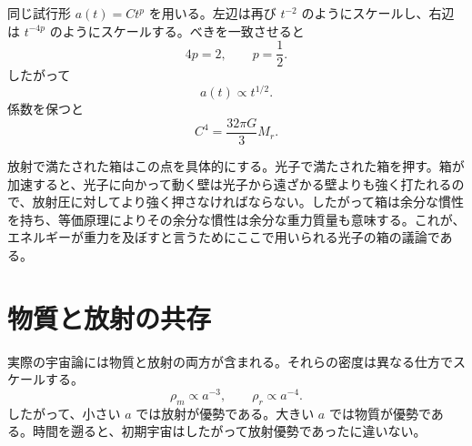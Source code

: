 同じ試行形 \(a(t)=Ct^p\) を用いる。左辺は再び \(t^{-2}\) のようにスケールし、右辺は \(t^{-4p}\) のようにスケールする。べきを一致させると
\begin{equation}
4p=2,
\qquad
p=\frac{1}{2}.
\end{equation}
したがって
\begin{equation}
a(t)\propto t^{1/2}.
\end{equation}
係数を保つと
\begin{equation}
C^4=\frac{32\pi G}{3}M_r.
\end{equation}

\begin{classroomqa}
\end{classroomqa}

放射で満たされた箱はこの点を具体的にする。光子で満たされた箱を押す。箱が加速すると、光子に向かって動く壁は光子から遠ざかる壁よりも強く打たれるので、放射圧に対してより強く押さなければならない。したがって箱は余分な慣性を持ち、等価原理によりその余分な慣性は余分な重力質量も意味する。これが、エネルギーが重力を及ぼすと言うためにここで用いられる光子の箱の議論である。

\begin{classroomqa}
\end{classroomqa}

\begin{classroomqa}
\end{classroomqa}

\section{物質と放射の共存}

実際の宇宙論には物質と放射の両方が含まれる。それらの密度は異なる仕方でスケールする。
\begin{equation}
\rho_m\propto a^{-3},
\qquad
\rho_r\propto a^{-4}.
\end{equation}
したがって、小さい \(a\) では放射が優勢である。大きい \(a\) では物質が優勢である。時間を遡ると、初期宇宙はしたがって放射優勢であったに違いない。

